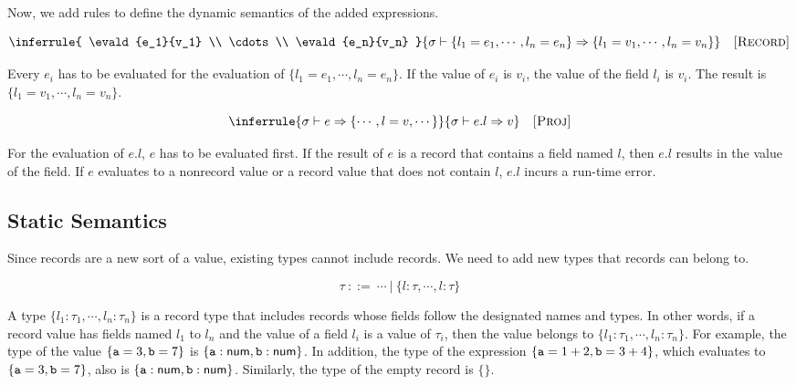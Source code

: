 Now, we add rules to define the dynamic semantics of the added expressions.


\vspace{-1em}

\[
  \inferrule
  { \evald{e_1}{v_1} \\
    \cdots \\
    \evald{e_n}{v_n} }
  { \evald{\{l_1=e_1,\cdots,l_n=e_n\}}{\{l_1=v_1,\cdots,l_n=v_n\}} }
  \quad\textsc{[Record]}
\]

Every $e_i$ has to be evaluated for the evaluation of
$\{l_1=e_1,\cdots,l_n=e_n\}$. If the value of $e_i$ is $v_i$, the value of
the field $l_i$ is $v_i$. The result is $\{l_1=v_1,\cdots,l_n=v_n\}$.


\vspace{-1em}

\[
  \inferrule
  { \evald{e}{\{\cdots,l=v,\cdots\}} }
  { \evald{e.l}{v} }
  \quad\textsc{[Proj]}
\]

For the evaluation of $e.l$, $e$ has to be evaluated first.
If the result of $e$ is a record that contains a field named $l$, then
$e.l$ results in the value of the field.
If $e$ evaluates to a nonrecord value or a record value that
does not contain $l$, $e.l$ incurs a run-time error.

\subsection{Static Semantics}

Since records are a new sort of a value, existing types cannot include records.
We need to add new types that records can belong to.

\[ \tau \ ::= \ \cdots \ |\ \{l:\tau,\cdots,l:\tau\} \]

A type $\{l_1:\tau_1,\cdots,l_n:\tau_n\}$ is a record type that includes
records whose fields follow the designated names and types. In other words, if a
record value has fields named $l_1$ to $l_n$ and the value of a field $l_i$ is
a value of $\tau_i$, then the value belongs to
$\{l_1:\tau_1,\cdots,l_n:\tau_n\}$. For example, the type of the value $\{\texttt{a}=3,\texttt{b}=7\}$ is
$\{\texttt{a}:\textsf{num},\texttt{b}:\textsf{num}\}$. In addition, the type of the expression
$\{\texttt{a}=1+2,\texttt{b}=3+4\}$, which evaluates to $\{\texttt{a}=3,\texttt{b}=7\}$, also is
$\{\texttt{a}:\textsf{num},\texttt{b}:\textsf{num}\}$. Similarly, the type of the empty record is $\{\}$.

